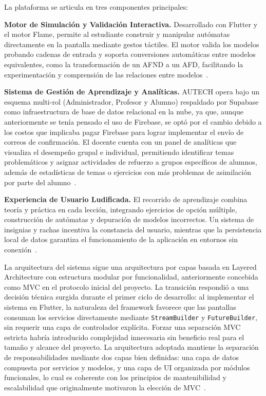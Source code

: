 La plataforma se articula en tres componentes principales:

\textbf{Motor de Simulación y Validación Interactiva.} Desarrollado con Flutter y el motor
Flame, permite al estudiante construir y manipular autómatas directamente en la pantalla
mediante gestos táctiles. El motor valida los modelos probando cadenas de entrada y soporta
conversiones automáticas entre modelos equivalentes, como la transformación de un AFND a un
AFD, facilitando la experimentación y comprensión de las relaciones entre
modelos~\cite{sinchi2018, rodger2006}.

\textbf{Sistema de Gestión de Aprendizaje y Analíticas.} AUTECH opera bajo un esquema
multi-rol (Administrador, Profesor y Alumno) respaldado por Supabase como infraestructura de
base de datos relacional en la nube, ya que, aunque anteriormente se tenía pensado el uso de
Firebase, se optó por el cambio debido a los costos que implicaba pagar Firebase para lograr
implementar el envío de correos de confirmación. El docente cuenta con un panel de analíticas
que visualiza el desempeño grupal e individual, permitiendo identificar temas problemáticos y
asignar actividades de refuerzo a grupos específicos de alumnos, además de estadísticas de
temas o ejercicios con más problemas de asimilación por parte del
alumno~\cite{felder2016, munoz2012}.

\newpage
\textbf{Experiencia de Usuario Ludificada.} El recorrido de aprendizaje combina teoría y
práctica en cada lección, integrando ejercicios de opción múltiple, construcción de autómatas
y depuración de modelos incorrectos. Un sistema de insignias y rachas incentiva la constancia
del usuario, mientras que la persistencia local de datos garantiza el funcionamiento de la
aplicación en entornos sin conexión~\cite{deterding2011, materialdesign2023}.

La arquitectura del sistema sigue una arquitectura por capas basada en Layered Architecture
con estructura modular por funcionalidad, anteriormente concebida como MVC en el protocolo
inicial del proyecto. La transición respondió a una decisión técnica surgida durante el primer
ciclo de desarrollo: al implementar el sistema en Flutter, la naturaleza del framework favorece
que las pantallas consuman los servicios directamente mediante \texttt{StreamBuilder} y
\texttt{FutureBuilder}, sin requerir una capa de controlador explícita. Forzar una separación
MVC estricta habría introducido complejidad innecesaria sin beneficio real para el tamaño y
alcance del proyecto. La arquitectura adoptada mantiene la separación de responsabilidades
mediante dos capas bien definidas: una capa de datos compuesta por servicios y modelos, y una
capa de UI organizada por módulos funcionales, lo cual es coherente con los principios de
mantenibilidad y escalabilidad que originalmente motivaron la elección de
MVC~\cite{pressman2010, reenskaug1979}.

